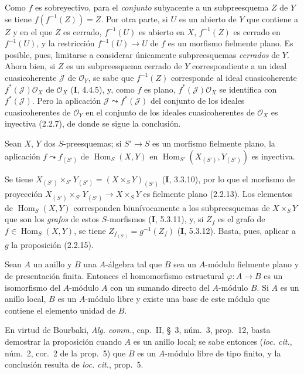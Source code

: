 Como $f$ es sobreyectivo, para el \emph{conjunto} subyacente a un subpreesquema $Z$
de $Y$ se tiene $f(f^{-1}(Z))=Z$. Por otra parte, si $U$ es un abierto de $Y$
que contiene a $Z$ y en el que $Z$ es cerrado, $f^{-1}(U)$ es abierto en $X$,
$f^{-1}(Z)$ es cerrado en $f^{-1}(U)$, y la restricción $f^{-1}(U)\to U$ de
$f$ es un morfismo fielmente plano. Es posible, pues, limitarse a considerar
únicamente subpreesquemas \emph{cerrados} de $Y$. Ahora bien, si $Z$ es un
subpreesquema cerrado de $Y$ correspondiente a un ideal cuasicoherente
$\mathscr J$ de $\mathcal O_Y$, se sabe que $f^{-1}(Z)$ corresponde al ideal
cuasicoherente $f^*(\mathscr J)\mathcal O_X$ de $\mathcal O_X$ (\textbf I, 4.4.5),
y, como $f$ es plano, $f^*(\mathscr J)\mathcal O_X$ se identifica con
$f^*(\mathscr J)$. Pero la aplicación $\mathscr J\leadsto f^*(\mathscr J)$ del
conjunto de los ideales cuasicoherentes de $\mathcal O_Y$ en el conjunto de
los ideales cuasicoherentes de $\mathcal O_X$ es inyectiva (2.2.7), de donde
se sigue la conclusión.

\begin{corollary}[2.2.16]
\label{IV.2.2.16-fr}
Sean $X$, $Y$ dos $S$-preesquemas; si $S'\to S$ es un morfismo fielmente
plano, la aplicación $f\leadsto f_{(S')}$ de $\operatorname{Hom}_S(X,Y)$ en
$\operatorname{Hom}_{S'}(X_{(S')},Y_{(S')})$ es inyectiva.
\end{corollary}

Se tiene $X_{(S')}\times_{S'}Y_{(S')}=(X\times_S Y)_{(S')}$ (\textbf I, 3.3.10), por
lo que el morfismo de proyección
$X_{(S')}\times_{S'}Y_{(S')}\to X\times_S Y$ es fielmente plano (2.2.13).
Los elementos de $\operatorname{Hom}_S(X,Y)$ corresponden biunívocamente a
los subpreesquemas de $X\times_S Y$ que son los \emph{grafos} de estos
$S$-morfismos (\textbf I, 5.3.11), y, si $Z_f$ es el grafo de
$f\in\operatorname{Hom}_S(X,Y)$, se tiene $Z_{f_{(S')}}=g^{-1}(Z_f)$
(\textbf I, 5.3.12). Basta, pues, aplicar a $g$ la proposición (2.2.15).

\begin{proposition}[2.2.17]
\label{IV.2.2.17-fr}
Sean $A$ un anillo y $B$ una $A$-álgebra tal que $B$ sea un $A$-módulo
fielmente plano y de presentación finita. Entonces el homomorfismo estructural
$\varphi:A\to B$ es un isomorfismo del $A$-módulo $A$ con un sumando
directo del $A$-módulo $B$. Si $A$ es un anillo local, $B$ es un $A$-módulo
libre y existe una base de este módulo que contiene el elemento unidad de $B$.
\end{proposition}

En virtud de Bourbaki, \emph{Alg. comm.}, cap.~II, \S~3,
núm.~3, prop.~12, basta demostrar la proposición cuando $A$
es un anillo local; se sabe entonces (\emph{loc. cit.},
núm.~2, cor.~2 de la prop.~5) que $B$ es un $A$-módulo libre
de tipo finito, y la conclusión resulta de \emph{loc. cit.}, prop.~5.
